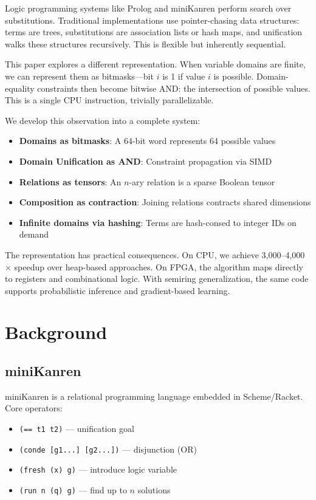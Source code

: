 \documentclass[11pt,a4paper]{article}
\begin{document}
Logic programming systems like Prolog and miniKanren \cite{reasoned_schemer_chirho} perform search over substitutions.
Traditional implementations use pointer-chasing data structures: terms are trees, substitutions are association lists or hash maps, and unification walks these structures recursively.
This is flexible but inherently sequential.

This paper explores a different representation.
When variable domains are finite, we can represent them as bitmasks---bit $i$ is 1 if value $i$ is possible.
Domain-equality constraints then become bitwise AND: the intersection of possible values.
This is a single CPU instruction, trivially parallelizable.

We develop this observation into a complete system:
\begin{itemize}
  \item \textbf{Domains as bitmasks}: A 64-bit word represents 64 possible values
  \item \textbf{Domain Unification as AND}: Constraint propagation via SIMD
  \item \textbf{Relations as tensors}: An $n$-ary relation is a sparse Boolean tensor
  \item \textbf{Composition as contraction}: Joining relations contracts shared dimensions
  \item \textbf{Infinite domains via hashing}: Terms are hash-consed to integer IDs on demand
\end{itemize}

The representation has practical consequences.
On CPU, we achieve 3,000--4,000$\times$ speedup over heap-based approaches.
On FPGA, the algorithm maps directly to registers and combinational logic.
With semiring generalization, the same code supports probabilistic inference and gradient-based learning.

\section{Background}

\subsection{miniKanren}

miniKanren \cite{reasoned_schemer_chirho} is a relational programming language embedded in Scheme/Racket.
Core operators:
\begin{itemize}
  \item \texttt{(== t1 t2)} --- unification goal
  \item \texttt{(conde [g1...] [g2...])} --- disjunction (OR)
  \item \texttt{(fresh (x) g)} --- introduce logic variable
  \item \texttt{(run n (q) g)} --- find up to $n$ solutions
\end{itemize}
\end{document}
